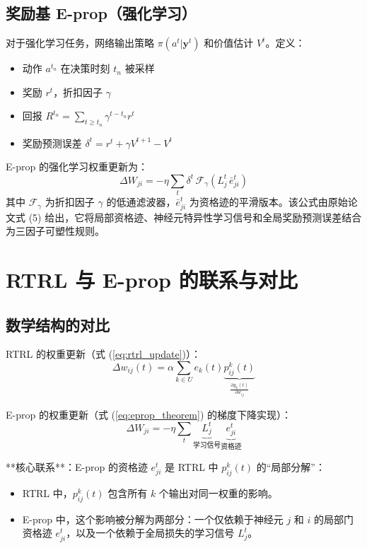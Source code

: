 \documentclass{article}
\begin{document}
\subsection{奖励基 E-prop（强化学习）}

对于强化学习任务，网络输出策略 $\pi(a^t|\mathbf{y}^t)$ 和价值估计 $V^t$。定义：
\begin{itemize}
    \item 动作 $a^{t_n}$ 在决策时刻 $t_n$ 被采样
    \item 奖励 $r^t$，折扣因子 $\gamma$
    \item 回报 $R^{t_n} = \sum_{t \ge t_n} \gamma^{t - t_n} r^t$
    \item 奖励预测误差 $\delta^t = r^t + \gamma V^{t+1} - V^t$
\end{itemize}

E-prop 的强化学习权重更新为：
\begin{equation}
\boxed{
\Delta W_{ji} = -\eta \sum_t \delta^t \, \mathcal{F}_\gamma\left( L_j^t \, \bar{e}_{ji}^t \right)
}
\label{eq:eprop_rl_update}
\end{equation}
其中 $\mathcal{F}_\gamma$ 为折扣因子 $\gamma$ 的低通滤波器，$\bar{e}_{ji}^t$ 为资格迹的平滑版本。该公式由原始论文式 (5) 给出，它将局部资格迹、神经元特异性学习信号和全局奖励预测误差结合为三因子可塑性规则。

\section{RTRL 与 E-prop 的联系与对比}

\subsection{数学结构的对比}

RTRL 的权重更新（式 (\ref{eq:rtrl_update})）：
\[
\Delta w_{ij}(t) = \alpha \sum_{k \in U} e_k(t) \underbrace{p_{ij}^k(t)}_{\frac{\partial y_k(t)}{\partial w_{ij}}}
\]

E-prop 的权重更新（式 (\ref{eq:eprop_theorem}) 的梯度下降实现）：
\[
\Delta W_{ji} = -\eta \sum_t \underbrace{L_j^t}_{\text{学习信号}} \underbrace{e_{ji}^t}_{\text{资格迹}}
\]

**核心联系**：E-prop 的资格迹 $e_{ji}^t$ 是 RTRL 中 $p_{ij}^k(t)$ 的“局部分解”：
\begin{itemize}
    \item RTRL 中，$p_{ij}^k(t)$ 包含所有 $k$ 个输出对同一权重的影响。
    \item E-prop 中，这个影响被分解为两部分：一个仅依赖于神经元 $j$ 和 $i$ 的局部门资格迹 $e_{ji}^t$，以及一个依赖于全局损失的学习信号 $L_j^t$。
\end{itemize}
\end{document}
